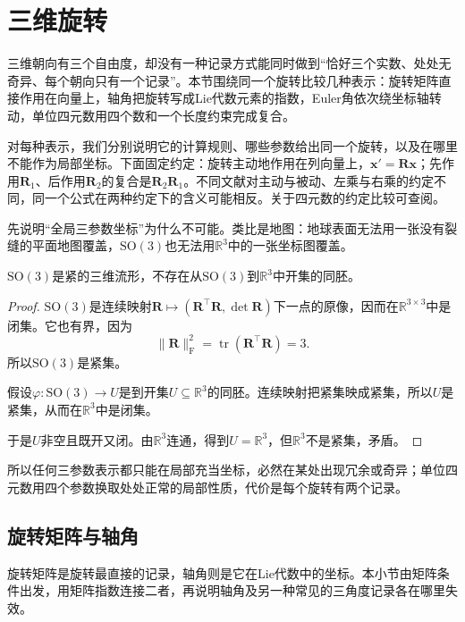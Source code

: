 \section{三维旋转}
\label{sec:lie-rotations}

三维朝向有三个自由度，却没有一种记录方式能同时做到“恰好三个实数、处处无奇异、每个朝向只有一个记录”。本节围绕同一个旋转比较几种表示：旋转矩阵直接作用在向量上，轴角把旋转写成Lie代数元素的指数，Euler角依次绕坐标轴转动，单位四元数用四个数和一个长度约束完成复合。

对每种表示，我们分别说明它的计算规则、哪些参数给出同一个旋转，以及在哪里不能作为局部坐标。下面固定约定：旋转主动地作用在列向量上，$\bm x'=\bm R\bm x$；先作用$\bm R_1$、后作用$\bm R_2$的复合是$\bm R_2\bm R_1$。不同文献对主动与被动、左乘与右乘的约定不同，同一个公式在两种约定下的含义可能相反。关于四元数的约定比较可查阅。

先说明“全局三参数坐标”为什么不可能。类比是地图：地球表面无法用一张没有裂缝的平面地图覆盖，$\mathrm{SO}(3)$也无法用$\mathbb R^3$中的一张坐标图覆盖。

\begin{theorem}[三维旋转群没有单张坐标图]
\label{thm:lie-so3-no-global-chart}
$\mathrm{SO}(3)$是紧的三维流形，不存在从$\mathrm{SO}(3)$到$\mathbb R^3$中开集的同胚。
\end{theorem}

\begin{proof}
$\mathrm{SO}(3)$是连续映射$\bm R\mapsto(\bm R^\top\bm R,\det\bm R)$下一点的原像，因而在$\mathbb R^{3\times3}$中是闭集。它也有界，因为
\[
\lVert\bm R\rVert_{\mathrm F}^2=\operatorname{tr}(\bm R^\top\bm R)=3.
\]
所以$\mathrm{SO}(3)$是紧集。

假设$\varphi:\mathrm{SO}(3)\to U$是到开集$U\subseteq\mathbb R^3$的同胚。连续映射把紧集映成紧集，所以$U$是紧集，从而在$\mathbb R^3$中是闭集。

于是$U$非空且既开又闭。由$\mathbb R^3$连通，得到$U=\mathbb R^3$，但$\mathbb R^3$不是紧集，矛盾。
\end{proof}

所以任何三参数表示都只能在局部充当坐标，必然在某处出现冗余或奇异；单位四元数用四个参数换取处处正常的局部性质，代价是每个旋转有两个记录。

\subsection{旋转矩阵与轴角}
\label{sec:lie-rotation-axis-angle}

旋转矩阵是旋转最直接的记录，轴角则是它在Lie代数中的坐标。本小节由矩阵条件出发，用矩阵指数连接二者，再说明轴角及另一种常见的三角度记录各在哪里失效。

